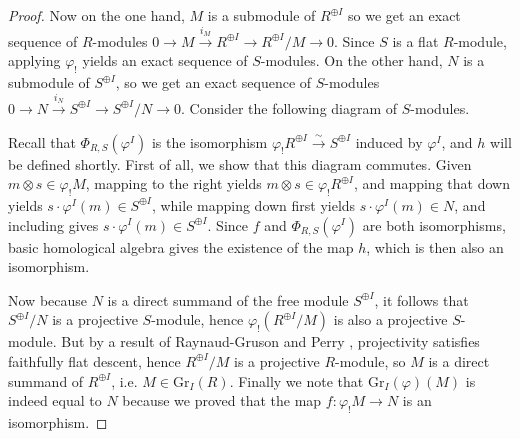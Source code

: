 \documentclass[oneside,11pt]{amsart}
\newcommand{\Gr}{\ensuremath{\text{Gr}}}
\theoremstyle{definition}
\newtheorem{proof techniques}{Proof Techniques}
\begin{document}
\begin{proof}
Now on the one hand, $M$ is a submodule of $R^{\oplus I}$ so we get an exact sequence of $R$-modules $0 \to M \overset{i_M}{\to} R^{\oplus I} \to R^{\oplus I} / M \to 0$. Since $S$ is a flat $R$-module, applying $\varphi_!$ yields an exact sequence of $S$-modules. On the other hand, $N$ is a submodule of $S^{\oplus I}$, so we get an exact sequence of $S$-modules $0 \to N \overset{i_N}{\to} S^{\oplus I} \to S^{\oplus I} / N \to 0$. Consider the following diagram of $S$-modules. 
\begin{center}
\end{center}
Recall that $\Phi_{R, S}(\varphi^I)$ is the isomorphism $\varphi_! R^{\oplus I}  \overset{\sim}{\to} S^{\oplus I}$ induced by $\varphi^I$, and $h$ will be defined shortly. First of all, we show that this diagram commutes. Given $m \otimes s \in \varphi_! M$, mapping to the right yields $m \otimes s \in \varphi_! R^{\oplus I}$, and mapping that down yields $s \cdot \varphi^I(m) \in S^{\oplus I}$, while mapping down first yields $s \cdot \varphi^I(m) \in N$, and including gives $s \cdot \varphi^I(m) \in S^{\oplus I}$. Since $f$ and $\Phi_{R, S}(\varphi^I)$ are both isomorphisms, basic homological algebra gives the existence of the map $h$, which is then also an isomorphism. 

Now because $N$ is a direct summand of the free module $S^{\oplus I}$, it follows that $S^{\oplus I} / N$ is a projective $S$-module, hence $\varphi_! ( R^{\oplus I} / M )$ is also a projective $S$-module. But by a result of Raynaud-Gruson \cite{raynaud-gruson1971} and Perry \cite{perry2010}, projectivity satisfies faithfully flat descent, hence $R^{\oplus I} / M$ is a projective $R$-module, so $M$ is a direct summand of $R^{\oplus I}$, i.e. $M \in \Gr_I(R)$. Finally we note that $\Gr_I(\varphi)(M)$ is indeed equal to $N$ because we proved that the map $f: \varphi_! M \to N$ is an isomorphism. 

\end{proof}


\end{document}
